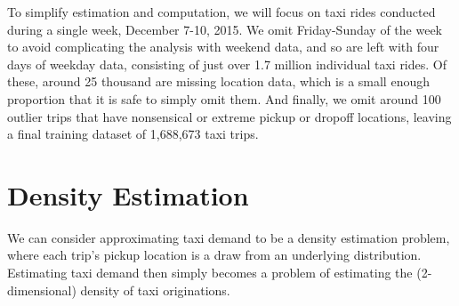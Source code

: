 \documentclass[12pt]{article}
\theoremstyle{definition}
\theoremstyle{algodesc}
\begin{document}
To simplify estimation and computation, we will focus on taxi rides conducted during a single week, December 7-10, 2015. We omit Friday-Sunday of the week to avoid complicating the analysis with weekend data, and so are left with four days of weekday data, consisting of just over 1.7 million individual taxi rides. Of these, around 25 thousand are missing location data, which is a small enough proportion that it is safe to simply omit them. And finally, we omit around 100 outlier trips that have nonsensical or extreme pickup or dropoff locations, leaving a final training dataset of 1,688,673 taxi trips.


\section{Density Estimation}
We can consider approximating taxi demand to be a density estimation problem, where each trip's pickup location is a draw from an underlying distribution. Estimating taxi demand then simply becomes a problem of estimating the (2-dimensional) density of taxi originations.
\end{document}
